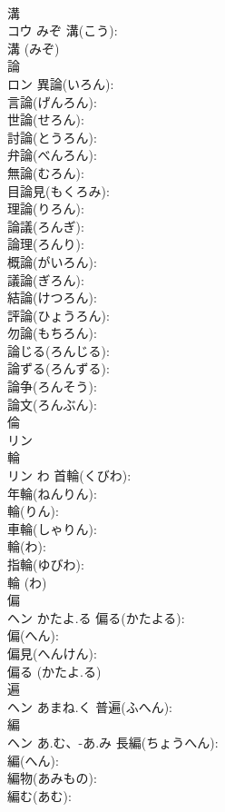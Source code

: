 \documentclass[8pt]{extreport}
\begin{document}
\begin{CJK}{UTF8}{min}
\\	溝			
\\	コウ	みぞ	溝(こう): 
\\	溝 (みぞ)
\\	論			
\\	ロン		異論(いろん): 
\\	言論(げんろん): 
\\	世論(せろん): 
\\	討論(とうろん): 
\\	弁論(べんろん): 
\\	無論(むろん): 
\\	目論見(もくろみ): 
\\	理論(りろん): 
\\	論議(ろんぎ): 
\\	論理(ろんり): 
\\	概論(がいろん): 
\\	議論(ぎろん): 
\\	結論(けつろん): 
\\	評論(ひょうろん): 
\\	勿論(もちろん): 
\\	論じる(ろんじる): 
\\	論ずる(ろんずる): 
\\	論争(ろんそう): 
\\	論文(ろんぶん): 
\\	倫			
\\	リン			
\\	輪			
\\	リン	わ	首輪(くびわ): 
\\	年輪(ねんりん): 
\\	輪(りん): 
\\	車輪(しゃりん): 
\\	輪(わ): 
\\	指輪(ゆびわ): 
\\	輪 (わ)
\\	偏			
\\	ヘン	かたよ.る	偏る(かたよる): 
\\	偏(へん): 
\\	偏見(へんけん): 
\\	偏る (かたよ.る)
\\	遍			
\\	ヘン	あまね.く	普遍(ふへん): 
\\	編			
\\	ヘン	あ.む、-あ.み	長編(ちょうへん): 
\\	編(へん): 
\\	編物(あみもの): 
\\	編む(あむ): 

\end{CJK}
\end{document}
